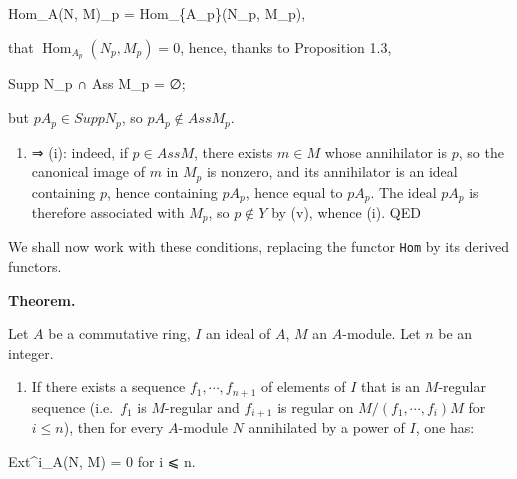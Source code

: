 \documentclass[
  11pt,
  a4paper,
]{book}
\newenvironment{Shaded}{}{}
\newcommand{\NormalTok}[1]{#1}
\providecommand{\tightlist}{%
  \setlength{\itemsep}{0pt}\setlength{\parskip}{0pt}}
\begin{document}
\begin{Shaded}
\begin{Highlighting}[]
\NormalTok{Hom\_A(N, M)\_p = Hom\_\{A\_p\}(N\_p, M\_p),}
\end{Highlighting}
\end{Shaded}

that \(\operatorname{Hom}_{A_{p}}(N_{p}, M_{p}) = 0\), hence, thanks to
Proposition 1.3,

\begin{Shaded}
\begin{Highlighting}[]
\NormalTok{Supp N\_p ∩ Ass M\_p = ∅;}
\end{Highlighting}
\end{Shaded}

but \(pA_{p} \in Supp N_{p}\), so \(pA_{p} \notin Ass M_{p}\).

\begin{enumerate}
\def\labelenumi{(\alph{enumi})}
\setcounter{enumi}{21}
\tightlist
\item
  ⇒ (i): indeed, if \(p \in Ass M\), there exists \(m \in M\) whose
  annihilator is \(p\), so the canonical image of \(m\) in \(M_{p}\) is
  nonzero, and its annihilator is an ideal containing \(p\), hence
  containing \(pA_{p}\), hence equal to \(pA_{p}\). The ideal \(pA_{p}\)
  is therefore associated with \(M_{p}\), so \(p \notin Y\) by (v),
  whence (i). QED
\end{enumerate}

We shall now work with these conditions, replacing the functor
\texttt{Hom} by its derived functors.

\textbf{Theorem.}

Let \(A\) be a commutative ring, \(I\) an ideal of \(A\), \(M\) an
\(A\)-module. Let \(n\) be an integer.

\begin{enumerate}
\def\labelenumi{\alph{enumi})}
\tightlist
\item
  If there exists a sequence \(f_{1}, \cdots, f_{n+1}\) of elements of
  \(I\) that is an \(M\)-regular sequence (i.e.~\(f_{1}\) is
  \(M\)-regular and \(f_{i+1}\) is regular on
  \(M/(f_{1}, \cdots, f_{i})M\) for \(i \leqslant n\)), then for every
  \(A\)-module \(N\) annihilated by a power of \(I\), one has:
\end{enumerate}

\begin{Shaded}
\begin{Highlighting}[]
\NormalTok{Ext\^{}i\_A(N, M) = 0 for i ⩽ n.}
\end{Highlighting}
\end{Shaded}
\end{document}
